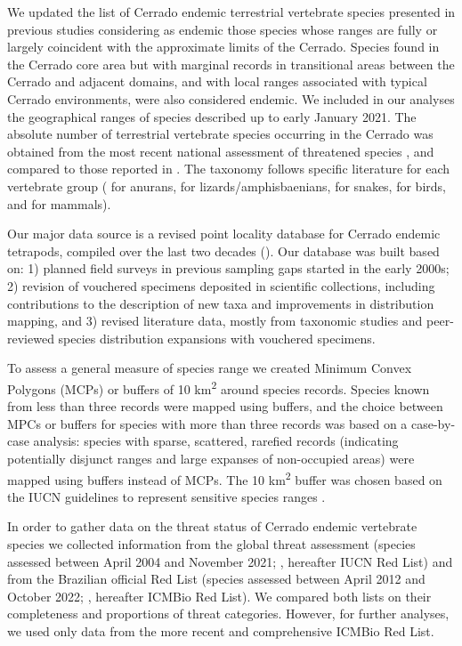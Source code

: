 \documentclass[12pt,openright,oneside,a4paper,english]{abntex2}
\begin{document}
We updated the list of Cerrado endemic terrestrial vertebrate species presented in previous studies \citep{Silva1997, Nogueira2011, Carmignotto2012, Azevedo2016, GutierrezMarinho2017} considering as endemic those species whose ranges are fully or largely coincident with the approximate limits of the Cerrado. Species found in the Cerrado core area but with marginal records in transitional areas between the Cerrado and adjacent domains, and with local ranges associated with typical Cerrado environments, were also considered endemic. We included in our analyses the geographical ranges of species described up to early January 2021. The absolute number of terrestrial vertebrate species occurring in the Cerrado was obtained from the most recent national assessment of threatened species \citep{ICMBio2023}, and compared to those reported in \citet{Myers2000}. The taxonomy follows specific literature for each vertebrate group (\citealp{Frost2020} for anurans, \citealp{Uetz2020} for lizards/amphisbaenians, \citealp{Nogueira2019} for snakes, \citealp{Pacheco2021birds} for birds, and \citealp{Abreu2021} for mammals).

Our major data source is a revised point locality database for Cerrado endemic tetrapods, compiled over the last two decades (\citealp[see details in][]{Nogueira2009, Nogueira2011, Valdujo2012, Nogueira2019, Carmignotto2022}). Our database was built based on: 1) planned field surveys in previous sampling gaps started in the early 2000s; 2) revision of vouchered specimens deposited in scientific collections, including contributions to the description of new taxa and improvements in distribution mapping, and 3) revised literature data, mostly from taxonomic studies and peer-reviewed species distribution expansions with vouchered specimens.

To assess a general measure of species range we created Minimum Convex Polygons (MCPs) or buffers of 10 km\textsuperscript{2} around species records. Species known from less than three records were mapped using buffers, and the choice between MPCs or buffers for species with more than three records was based on a case-by-case analysis: species with sparse, scattered, rarefied records (indicating potentially disjunct ranges and large expanses of non-occupied areas) were mapped using buffers instead of MCPs. The 10 km\textsuperscript{2} buffer was chosen based on the IUCN guidelines to represent sensitive species ranges \citep{IUCN-TWG}.

In order to gather data on the threat status of Cerrado endemic vertebrate species we collected information from the global threat assessment (species assessed between April 2004 and November 2021; \citealp{IUCN2023}, hereafter IUCN Red List) and from the Brazilian official Red List (species assessed between April 2012 and October 2022; \citealp{ICMBio2023}, hereafter ICMBio Red List). We compared both lists on their completeness and proportions of threat categories. However, for further analyses, we used only data from the more recent and comprehensive ICMBio Red List.
\end{document}
